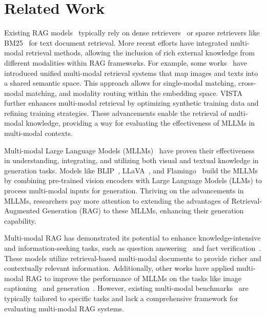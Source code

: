 \section{Related Work}
Existing RAG models~\cite{shi2023replug, asai2023self, yu2023augmentation, yan2024corrective} typically rely on dense retrievers~\cite{karpukhin2020dense, xiongapproximate, ren-etal-2021-rocketqav2, xiong2021answering, gao-callan-2022-unsupervised} or sparse retrievers like BM25~\cite{robertson2009probabilistic} for text document retrieval. More recent efforts have integrated multi-modal retrieval methods, allowing the inclusion of rich external knowledge from different modalities within RAG frameworks. For example, some works~\cite{liu2022universal, zhou2024marvel} have introduced unified multi-modal retrieval systems that map images and texts into a shared semantic space. This approach allows for single-modal matching, cross-modal matching, and modality routing within the embedding space. VISTA~\cite{zhou2024vista} further enhances multi-modal retrieval by optimizing synthetic training data and refining training strategies. These advancements enable the retrieval of multi-modal knowledge, providing a way for evaluating the effectiveness of MLLMs in multi-modal contexts.


Multi-modal Large Language Models (MLLMs)~\cite{achiam2023gpt,team2023gemini,sun2023emu,sun2024generative, aghajanyan2022cm3, lu2024deepseekvl} have proven their effectiveness in understanding, integrating, and utilizing both visual and textual knowledge in generation tasks. Models like BLIP~\cite{li2022blipbootstrappinglanguageimagepretraining, li2023blip}, LLaVA~\cite{liu2024visual}, and Flamingo~\cite{alayrac2022flamingo} build the MLLMs by combining pre-trained vision encoders with Large Language Models (LLMs) to process multi-modal inputs for generation. Thriving on the advancements in MLLMs, researchers pay more attention to extending the advantages of Retrieval-Augmented Generation (RAG) to these MLLMs, enhancing their generation capability. 

 
Multi-modal RAG has demonstrated its potential to enhance knowledge-intensive and information-seeking tasks, such as question answering~\cite{chang2022webqa, marino2019ok} and fact verification~\cite{mishra2022factify}. These models utilize retrieval-based multi-modal documents to provide richer and contextually relevant information. Additionally, other works have applied multi-modal RAG to improve the performance of MLLMs on the tasks like image captioning~\cite{lin2014microsoft, young2014image} and generation~\cite{yasunaga2023retrieval, yu2023scaling, sharifymoghaddam2024unirag}. However, existing multi-modal benchmarks~\cite{johnson2017clevr, schuhmann2021laion, lin2014microsoft, young2014image, marino2019ok} are typically tailored to specific tasks and lack a comprehensive framework for evaluating multi-modal RAG systems. 

